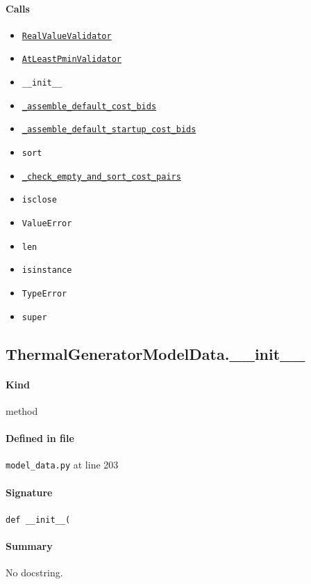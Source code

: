 \documentclass[11pt]{report}
\begin{document}
\paragraph{Calls}
\begin{itemize}[leftmargin=*]
  \item \hyperref[def:model_data.py:RealValueValidator:L58]{\texttt{RealValueValidator}}
  \item \hyperref[def:model_data.py:AtLeastPminValidator:L97]{\texttt{AtLeastPminValidator}}
  \item \texttt{\_\_init\_\_}
  \item \hyperref[def:model_data.py:ThermalGeneratorModelData._assemble_default_cost_bids:L267]{\texttt{\_assemble\_default\_cost\_bids}}
  \item \hyperref[def:model_data.py:ThermalGeneratorModelData._assemble_default_startup_cost_bids:L303]{\texttt{\_assemble\_default\_startup\_cost\_bids}}
  \item \texttt{sort}
  \item \hyperref[def:model_data.py:ThermalGeneratorModelData._check_empty_and_sort_cost_pairs:L245]{\texttt{\_check\_empty\_and\_sort\_cost\_pairs}}
  \item \texttt{isclose}
  \item \texttt{ValueError}
  \item \texttt{len}
  \item \texttt{isinstance}
  \item \texttt{TypeError}
  \item \texttt{super}
\end{itemize}
\subsection{ThermalGeneratorModelData.\_\_init\_\_}
\label{def:model_data.py:ThermalGeneratorModelData.__init__:L203}
\paragraph{Kind} method
\paragraph{Defined in file} \texttt{model\_data.py} at line 203
\paragraph{Signature} \texttt{def \_\_init\_\_(}
\paragraph{Summary} No docstring.
\end{document}
